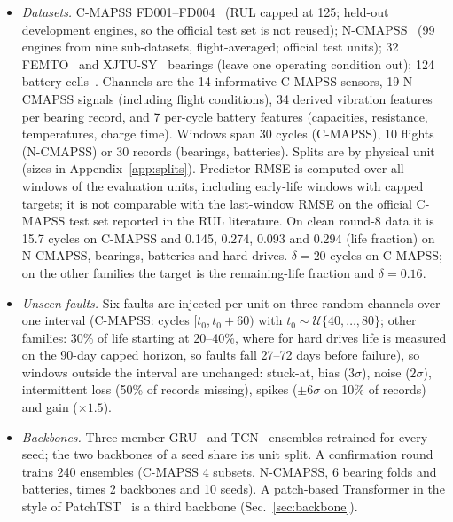 \documentclass{esannV2}
\begin{document}
\begin{itemize}
\item \emph{Datasets.} C-MAPSS FD001--FD004~\cite{saxena2008damage} (RUL capped at 125; held-out development engines, so the official test set is not reused); N-CMAPSS~\cite{arias2021ncmapss} (99 engines from nine sub-datasets, flight-averaged; official test units); 32 FEMTO~\cite{nectoux2012pronostia} and XJTU-SY~\cite{wang2020xjtusy} bearings (leave one operating condition out); 124 battery cells~\cite{severson2019battery}. Channels are the 14 informative C-MAPSS sensors, 19 N-CMAPSS signals (including flight conditions), 34 derived vibration features per bearing record, and 7 per-cycle battery features (capacities, resistance, temperatures, charge time). Windows span 30 cycles (C-MAPSS), 10 flights (N-CMAPSS) or 30 records (bearings, batteries). Splits are by physical unit (sizes in Appendix~\ref{app:splits}). Predictor RMSE is computed over all windows of the evaluation units, including early-life windows with capped targets; it is not comparable with the last-window RMSE on the official C-MAPSS test set reported in the RUL literature. On clean round-8 data it is 15.7 cycles on C-MAPSS and 0.145, 0.274, 0.093 and 0.294 (life fraction) on N-CMAPSS, bearings, batteries and hard drives. $\delta=20$ cycles on C-MAPSS; on the other families the target is the remaining-life fraction and $\delta=0.16$.
\item \emph{Unseen faults.} Six faults are injected per unit on three random channels over one interval (C-MAPSS: cycles $[t_0,t_0+60)$ with $t_0\sim\mathcal U\{40,\dots,80\}$; other families: 30\% of life starting at 20--40\%, where for hard drives life is measured on the 90-day capped horizon, so faults fall 27--72 days before failure), so windows outside the interval are unchanged: stuck-at, bias ($3\sigma$), noise ($2\sigma$), intermittent loss (50\% of records missing), spikes ($\pm6\sigma$ on 10\% of records) and gain ($\times1.5$).
\item \emph{Backbones.} Three-member GRU~\cite{cho2014learning} and TCN~\cite{bai2018empirical} ensembles retrained for every seed; the two backbones of a seed share its unit split. A confirmation round trains 240 ensembles (C-MAPSS 4 subsets, N-CMAPSS, 6 bearing folds and batteries, times 2 backbones and 10 seeds). A patch-based Transformer in the style of PatchTST~\cite{nie2023time} is a third backbone (Sec.~\ref{sec:backbone}).
\end{itemize}
\end{document}
